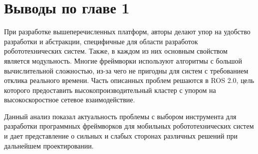 \section*{Выводы по главе 1}

При разработке вышеперечисленных платформ, авторы делают упор на удобство разработки и абстракции, специфичные для области разработок робототехнических систем. Также, в каждом из них основным свойством является модульность. Многие фреймворки используют алгоритмы с большой вычислительной сложностью, из-за чего не пригодны для систем с требованием отклика реального времени. Часть описанных проблем решаются в ROS 2.0, цель которого предоставить высокопроизводительный кластер с упором на высокоскоростное сетевое взаимодействие.

Данный анализ показал актуальность проблемы с выбором инструмента для разработки программных фреймворков для мобильных робототехнических систем и дает представление о сильных и слабых сторонах различных решений при дальнейшем проектировании. 